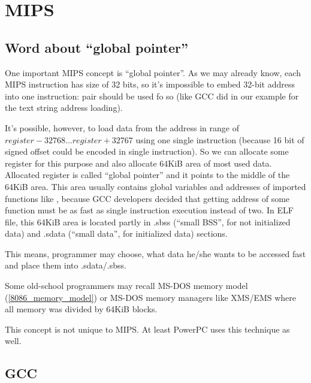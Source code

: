 ﻿\ifx\RUSSIAN\undefined
\section{MIPS}

\subsection{Word about ``global pointer''}

One important MIPS concept is ``global pointer''.
As we may already know, each MIPS instruction has size of 32 bits, so it's impossible to embed 32-bit
address into one instruction: pair should be used fo so (like GCC did in our example for the text string address
loading).

It's possible, however, to load data from the address in range of $register-32768...register+32767$ using one
single instruction (because 16 bit of signed offset could be encoded in single instruction).
So we can allocate some register for this purpose and also allocate 64KiB area of most used data.
Allocated register is called ``global pointer'' and it points to the middle of the 64KiB area.
This area usually contains global variables and addresses of imported functions like \printf, 
because GCC developers decided that getting address of some function must be as fast as single instruction
execution instead of two.
In ELF file, this 64KiB area is located partly in .sbss (``small \ac{BSS}'', for not initialized data) and 
.sdata (``small data'', for initialized data) sections.

This means, programmer may choose, what data he/she wants to be accessed fast and place them into .sdata/.sbss.

Some old-school programmers may recall MS-DOS memory model (\ref{8086_memory_model}) 
or MS-DOS memory managers like XMS/EMS where all memory was divided by 64KiB blocks.

This concept is not unique to MIPS. At least PowerPC uses this technique as well.

\subsection{\Optimizing GCC}



